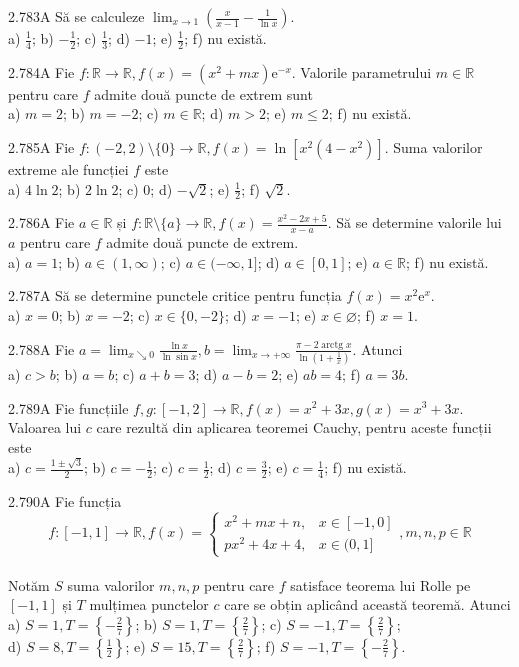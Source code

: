 \documentclass[11pt]{article}
\begin{document}
2.783A Să se calculeze $\lim _{x \rightarrow 1}\left(\frac{x}{x-1}-\frac{1}{\ln x}\right)$.\\ a) $\frac{1}{4}$; b) $-\frac{1}{2}$; c) $\frac{1}{3}$; d) $-1$; e) $\frac{1}{2}$; f) nu există.

2.784A Fie $f: \mathbb{R} \rightarrow \mathbb{R}, f(x)=\left(x^{2}+m x\right) \mathrm{e}^{-x}$. Valorile parametrului $m \in \mathbb{R}$ pentru care $f$ admite două puncte de extrem sunt\\ a) $m=2$; b) $m=-2$; c) $m \in \mathbb{R}$; d) $m>2$; e) $m \leq 2$; f) nu există. 

2.785A Fie $f:(-2,2) \setminus\{0\} \rightarrow \mathbb{R}, f(x)=\ln \left[x^{2}\left(4-x^{2}\right)\right]$. Suma valorilor extreme ale funcției $f$ este\\ a) $4 \ln 2$; b) $2 \ln 2$; c) $0$; d) $-\sqrt{2}$; e) $\frac{1}{2}$; f) $\sqrt{2}$.

2.786A Fie $a \in \mathbb{R}$ și $f: \mathbb{R} \setminus\{a\} \rightarrow \mathbb{R}, f(x)=\frac{x^{2}-2 x+5}{x-a}$. Să se determine valorile lui $a$ pentru care $f$ admite două puncte de extrem.\\ a) $a=1$; b) $a \in(1, \infty)$; c) $a \in(-\infty, 1]$; d) $a \in[0,1]$; e) $a \in \mathbb{R}$; f) nu există.

2.787A Să se determine punctele critice pentru funcția $f(x)=x^{2} \mathrm{e}^{x}$.\\ a) $x=0$; b) $x=-2$; c) $x \in\{0,-2\}$; d) $x=-1$; e) $x \in \varnothing$; f) $x=1$.

2.788A Fie $a=\lim _{x \searrow 0} \frac{\ln x}{\ln \sin x}, b=\lim _{x \rightarrow+\infty} \frac{\pi-2 \operatorname{arctg} x}{\ln \left(1+\frac{1}{x}\right)}$. Atunci\\ a) $c>b$; b) $a=b$; c) $a+b=3$; d) $a-b=2$; e) $a b=4$; f) $a=3 b$.

2.789A Fie funcțiile $f, g:[-1,2] \rightarrow \mathbb{R}, f(x)=x^{2}+3 x, g(x)=x^{3}+3 x$. Valoarea lui $c$ care rezultă din aplicarea teoremei Cauchy, pentru aceste funcții este\\ a) $c=\frac{1 \pm \sqrt{3}}{2}$; b) $c=-\frac{1}{2}$; c) $c=\frac{1}{2}$; d) $c=\frac{3}{2}$; e) $c=\frac{1}{4}$; f) nu există.

2.790A Fie funcția $$f:[-1,1] \rightarrow \mathbb{R}, f(x)=\left\{\begin{array}{ll}x^{2}+m x+n, & x \in[-1,0] \\p x^{2}+4 x+4, & x \in(0,1]\end{array}, m, n, p \in \mathbb{R}\right.$$\\Notăm $S$ suma valorilor $m, n, p$ pentru care $f$ satisface teorema lui Rolle pe $[-1,1]$ și $T$ mulțimea punctelor $c$ care se obțin aplicând această teoremă. Atunci\\ a) $S=1, T=\left\{-\frac{2}{7}\right\}$; b) $S=1, T=\left\{\frac{2}{7}\right\}$; c) $S=-1, T=\left\{\frac{2}{7}\right\}$;\\ d) $S=8, T=\left\{\frac{1}{2}\right\}$; e) $S=15, T=\left\{\frac{2}{7}\right\}$; f) $S=-1, T=\left\{-\frac{2}{7}\right\}$.
\end{document}
